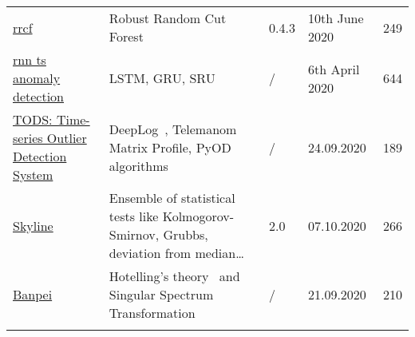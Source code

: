 \begin{table}[h]
{\begin{tabular}{lllll}
            \href{https://github.com/kLabUM/rrcf}{rrcf}                                                             & Robust Random Cut Forest~\cite{Guha.2016}                                                                                                                                                                                                                                                                                                                                                                                     & 0.4.3     & 10th June 2020    & 249   \\\addlinespace 
            \href{https://github.com/chickenbestlover/RNN-Time-series-Anomaly-Detection}{rnn ts anomaly detection}  & LSTM, GRU, SRU                                                                                                                                                                                                                                                                                                                                                                                                                & /         & 6th April 2020    & 644   \\\addlinespace 
            \href{https://github.com/datamllab/tods}{TODS: Time-series Outlier Detection System}                    & DeepLog~\cite{Du.2017}, Telemanom Matrix Profile, PyOD algorithms                                                                                                                                                                                                                                                                                                                                                             & /         & 24.09.2020        & 189   \\\addlinespace
            \href{https://github.com/earthgecko/skyline}{Skyline}                                                   & Ensemble of statistical tests like Kolmogorov-Smirnov, Grubbs, deviation from median\ldots                                                                                                                                                                                                                                                                                                                                    & 2.0       & 07.10.2020        & 266   \\\addlinespace
            \href{https://github.com/tsurubee/banpei}{Banpei}                                                       & Hotelling's theory~\cite{Hotelling.1990} and Singular Spectrum Transformation                                                                                                                                                                                                                                                                                                                                                 & /         & 21.09.2020        & 210   \\\addlinespace

\end{tabular}}
\end{table}
